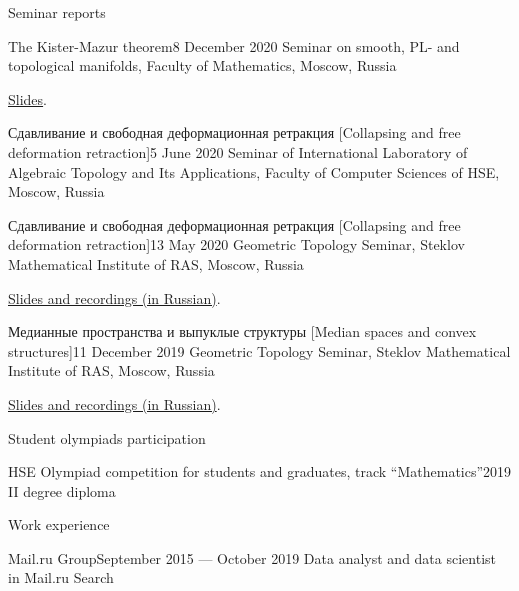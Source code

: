 \documentclass{resume}
\begin{document}
\begin{rSection}{Seminar reports}
  \begin{rSubsection}{The Kister-Mazur theorem}{8 December 2020}{}
    Seminar on smooth, PL- and topological manifolds, Faculty of Mathematics, Moscow, Russia
    \vspace{0.5em}

    \href{https://drive.google.com/file/d/1WE5F7Bgqm7x6pB6irsLrthQtfk3Psl7e/view}{Slides}.
  \end{rSubsection}

  \begin{rSubsection}{Сдавливание и свободная деформационная ретракция [Collapsing and free
      deformation retraction]}{5 June 2020}{}
    Seminar of International Laboratory of Algebraic Topology and Its Applications, Faculty of
    Computer Sciences of HSE, Moscow, Russia
  \end{rSubsection}

  \begin{rSubsection}{Сдавливание и свободная деформационная ретракция [Collapsing and free deformation retraction]}{13 May 2020}{}
    Geometric Topology Seminar, Steklov Mathematical Institute of RAS, Moscow, Russia
    \vspace{0.5em}

    \href{http://www.mathnet.ru/php/seminars.phtml?option_lang=eng&presentid=27125}{Slides and recordings (in Russian)}.
  \end{rSubsection}

  \begin{rSubsection}{Медианные пространства и выпуклые структуры [Median spaces and convex structures]}{11 December 2019}{}
    Geometric Topology Seminar, Steklov Mathematical Institute of RAS, Moscow, Russia
    \vspace{0.5em}

    \href{http://www.mathnet.ru/php/seminars.phtml?option_lang=eng&presentid=26027}{Slides and recordings (in Russian)}.
  \end{rSubsection}
\end{rSection}

\begin{rSection}{Student olympiads participation}
  \begin{rSubsection}{HSE Olympiad competition for students and graduates, track ``Mathematics''}{2019}{}
    II degree diploma
  \end{rSubsection}
\end{rSection}

\begin{rSection}{Work experience}
  \begin{rSubsection}{Mail.ru Group}{September 2015 --- October 2019}{}
    Data analyst and data scientist in Mail.ru Search
  \end{rSubsection}
\end{rSection}
\pagebreak
\end{document}
